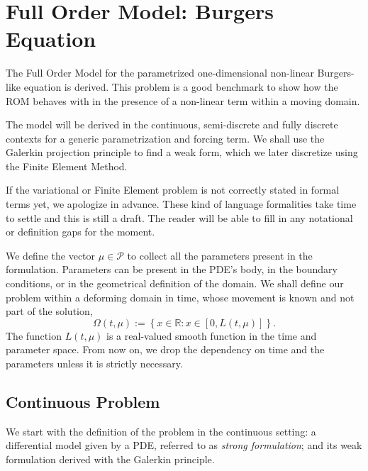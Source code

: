 \documentclass[../main.tex]{subfiles}
\begin{document}
\section{Full Order Model: Burgers Equation}
\label{sec:1d_fom_heat_equation_full_order_model}
The Full Order Model for the parametrized one-dimensional non-linear Burgers-like equation is derived.
This problem is a good benchmark to show how the ROM behaves with in the presence of a non-linear term within a moving domain.

The model will be derived in the continuous, semi-discrete and fully discrete contexts for a generic parametrization and forcing term.
We shall use the Galerkin projection principle to find a weak form, which we later discretize using the Finite Element Method. 

If the variational or Finite Element problem is not correctly stated in formal terms yet, we apologize in advance.
These kind of language formalities take time to settle and this is still a draft. 
The reader will be able to fill in any notational or definition gaps for the moment. 

We define the vector $\mu \in \mathcal{P}$ to collect all the parameters present in the formulation.
Parameters can be present in the PDE's body, in the boundary conditions, or in the geometrical definition of the domain. 
We shall define our problem within a deforming domain in time, whose movement is known and not part of the solution,
\begin{equation*}
    \Omega(t, \mu) := \left\{x \in \mathbb{R} : x \in \left[0, L(t, \mu)\right]\right\}.
\end{equation*}
The function $L(t, \mu)$ is a real-valued smooth function in the time and parameter space.
From now on, we drop the dependency on time and the parameters unless it is strictly necessary. 

\subsection{Continuous Problem}
We start with the definition of the problem in the continuous setting: 
a differential model given by a PDE, referred to as \emph{strong formulation}; 
and its weak formulation derived with the Galerkin principle.
\end{document}
